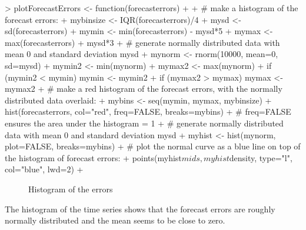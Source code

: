 \documentclass[11pt, a4paper]{article} %
\begin{document}
\begin{Schunk}
\begin{Sinput}
> plotForecastErrors <- function(forecasterrors)
+   {
+      # make a histogram of the forecast errors:
+      mybinsize <- IQR(forecasterrors)/4
+      mysd   <- sd(forecasterrors)
+      mymin  <- min(forecasterrors) - mysd*5
+      mymax  <- max(forecasterrors) + mysd*3
+      # generate normally distributed data with mean 0 and standard deviation mysd
+      mynorm <- rnorm(10000, mean=0, sd=mysd)
+      mymin2 <- min(mynorm)
+      mymax2 <- max(mynorm)
+      if (mymin2 < mymin) { mymin <- mymin2 }
+      if (mymax2 > mymax) { mymax <- mymax2 }
+      # make a red histogram of the forecast errors, with the normally distributed data overlaid:
+      mybins <- seq(mymin, mymax, mybinsize)
+      hist(forecasterrors, col="red", freq=FALSE, breaks=mybins)
+      # freq=FALSE ensures the area under the histogram = 1
+      # generate normally distributed data with mean 0 and standard deviation mysd
+      myhist <- hist(mynorm, plot=FALSE, breaks=mybins)
+      # plot the normal curve as a blue line on top of the histogram of forecast errors:
+      points(myhist$mids, myhist$density, type="l", col="blue", lwd=2)
+   }
\end{Sinput}
\end{Schunk}


\begin{figure}[H]
\centering
\begin{Schunk}
\end{Schunk}
\caption{Histogram of the errors}
\end{figure}

\noindent The histogram of the time series shows that the forecast errors are roughly normally distributed and the mean seems to be close to zero. 
\end{document}
